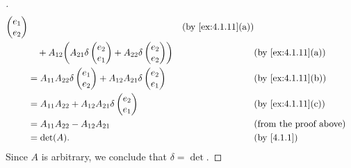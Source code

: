 \begin{proof}[]
\begin{align*}
{\begin{pmatrix}
                                                                              e_1 \\
                                                                              e_2
                                                                            \end{pmatrix}}             &  & \by{ex:4.1.11}[a]   \\
              & \quad + A_{1 2} \pa{A_{2 1} \delta\begin{pmatrix}
                                                      e_2 \\
                                                      e_1
                                                    \end{pmatrix} + A_{2 2} \delta\begin{pmatrix}
                                                                                    e_2 \\
                                                                                    e_2
                                                                                  \end{pmatrix}}         &  & \by{ex:4.1.11}[a] \\
              & = A_{1 1} A_{2 2} \delta\begin{pmatrix}
                                          e_1 \\
                                          e_2
                                        \end{pmatrix} + A_{1 2} A_{2 1} \delta\begin{pmatrix}
                                                                                e_2 \\
                                                                                e_1
                                                                              \end{pmatrix}     &  & \by{ex:4.1.11}[b]        \\
              & = A_{1 1} A_{2 2} + A_{1 2} A_{2 1} \delta\begin{pmatrix}
                                                            e_2 \\
                                                            e_1
                                                          \end{pmatrix} &  & \by{ex:4.1.11}[c]                                \\
              & = A_{1 1} A_{2 2} - A_{1 2} A_{2 1}                       &  & \text{(from the proof above)}                  \\
              & = \det(A).                                                &  & \by{4.1.1}
  \end{align*}
  Since \(A\) is arbitrary, we conclude that \(\delta = \det\).
\end{proof}

